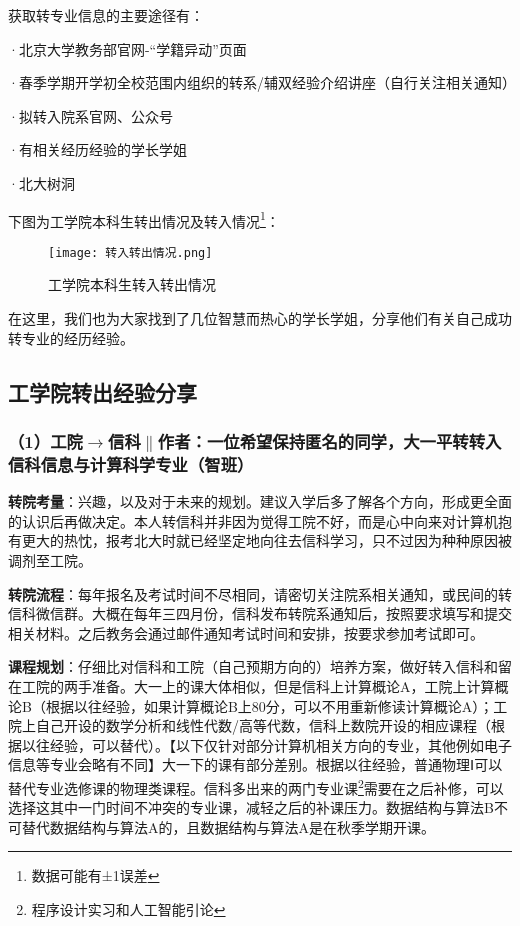 \documentclass[11pt,oneside]{book}
\begin{document}
\vspace{10pt}

获取转专业信息的主要途径有：

·北京大学教务部官网-“学籍异动”页面

·春季学期开学初全校范围内组织的转系/辅双经验介绍讲座（自行关注相关通知）

·拟转入院系官网、公众号

·有相关经历经验的学长学姐

·北大树洞


下图为工学院本科生转出情况及转入情况\footnote{数据可能有±1误差}：
\begin{figure}[htbp]
	\centering
	\texttt{[image: 转入转出情况.png]}
	\renewcommand{\figurename}{图}
	\caption{工学院本科生转入转出情况}
	\label{fig:enter-label}
\end{figure}

在这里，我们也为大家找到了几位智慧而热心的学长学姐，分享他们有关自己成功转专业的经历经验。

\subsection{工学院转出经验分享}
\subsubsection{（1）工院$\to$信科$\parallel$作者：一位希望保持匿名的同学，大一平转转入信科信息与计算科学专业（智班）}
\textbf{转院考量}：兴趣，以及对于未来的规划。建议入学后多了解各个方向，形成更全面的认识后再做决定。本人转信科并非因为觉得工院不好，而是心中向来对计算机抱有更大的热忱，报考北大时就已经坚定地向往去信科学习，只不过因为种种原因被调剂至工院。

\vspace{10pt}

\textbf{转院流程}：每年报名及考试时间不尽相同，请密切关注院系相关通知，或民间的转信科微信群。大概在每年三四月份，信科发布转院系通知后，按照要求填写和提交相关材料。之后教务会通过邮件通知考试时间和安排，按要求参加考试即可。

\vspace{10pt}

\textbf{课程规划}：仔细比对信科和工院（自己预期方向的）培养方案，做好转入信科和留在工院的两手准备。大一上的课大体相似，但是信科上计算概论A，工院上计算概论B（根据以往经验，如果计算概论B上80分，可以不用重新修读计算概论A）；工院上自己开设的数学分析和线性代数/高等代数，信科上数院开设的相应课程（根据以往经验，可以替代）。【以下仅针对部分计算机相关方向的专业，其他例如电子信息等专业会略有不同】大一下的课有部分差别。根据以往经验，普通物理Ⅰ可以替代专业选修课的物理类课程。信科多出来的两门专业课\footnote{程序设计实习和人工智能引论}需要在之后补修，可以选择这其中一门时间不冲突的专业课，减轻之后的补课压力。数据结构与算法B不可替代数据结构与算法A的，且数据结构与算法A是在秋季学期开课。
\end{document}
